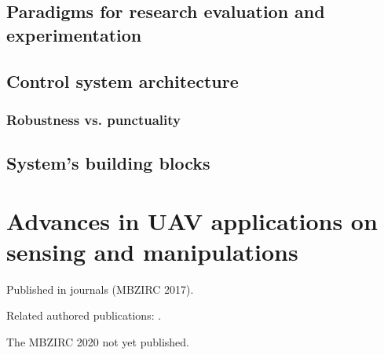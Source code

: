 \documentclass[a4paper,11pt,titlepage,twoside]{book}
\newcommand{\chapternoclear}[1]{
  \begingroup
  \let\cleardoublepage\clearpage
  \chapter{#1}
  \endgroup
}
\begin{document}

\section{Paradigms for research evaluation and experimentation}

\section{Control system architecture}

\subsection{Robustness vs. punctuality}

\section{System's building blocks}


%   

%   



\chapternoclear{Advances in UAV applications on sensing and manipulations}

Published in journals \cite{baca2019autonomous, spurny2019cooperative} (MBZIRC 2017).

Related authored publications: \cite{baca2018model, petrlik2020robust}.

The MBZIRC 2020 not yet published.

\end{document}
